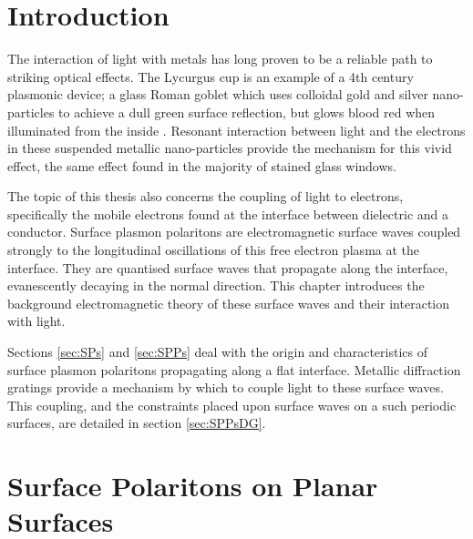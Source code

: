 
\section{Introduction}

The interaction of light with metals has long proven to be a reliable path to striking optical effects.  The Lycurgus cup is an example of a 4th century plasmonic device; a glass Roman goblet which uses colloidal gold and silver nano-particles to achieve a dull green surface reflection, but glows blood red when illuminated from the inside \cite{Barber1990}.  Resonant interaction between light and the electrons in these suspended metallic nano-particles provide the mechanism for this vivid effect, the same effect found in the majority of stained glass windows. 

The topic of this thesis also concerns the coupling of light to electrons, specifically the mobile electrons found at the interface between dielectric and a conductor. Surface plasmon polaritons are electromagnetic surface waves coupled strongly to the longitudinal oscillations of this free electron plasma at the interface. They are quantised surface waves that propagate along the interface, evanescently decaying in the normal direction. This chapter introduces the background electromagnetic theory of these surface waves and their interaction with light.

Sections \ref{sec:SPs} and \ref{sec:SPPs} deal with the origin and characteristics of surface plasmon polaritons propagating along a flat interface. Metallic diffraction gratings provide a mechanism by which to couple light to these surface waves. This coupling, and the constraints placed upon surface waves on a such periodic surfaces, are detailed in section \ref{sec:SPPsDG}. 

\section{Surface Polaritons on Planar Surfaces\label{sec:SPs}}

